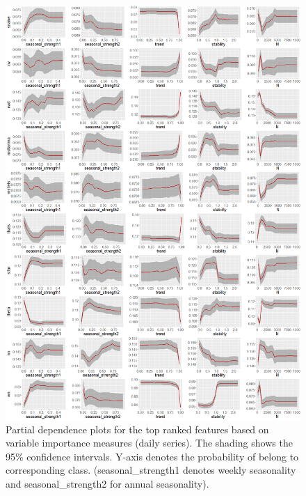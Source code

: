 \documentclass[11pt,a4paper,]{article}
\begin{document}
\newpage

\begin{figure}
\centering
\includegraphics{figures/dailypdp-1.png}
\caption{\label{fig:dailypdp}Partial dependence plots for the top ranked
features based on variable importance measures (daily series). The
shading shows the 95\% confidence intervals. Y-axis denotes the
probability of belong to corresponding class. (seasonal\_strength1
denotes weekly seasonality and seasonal\_strength2 for annual
seasonality).}
\end{figure}

\newpage
\end{document}
